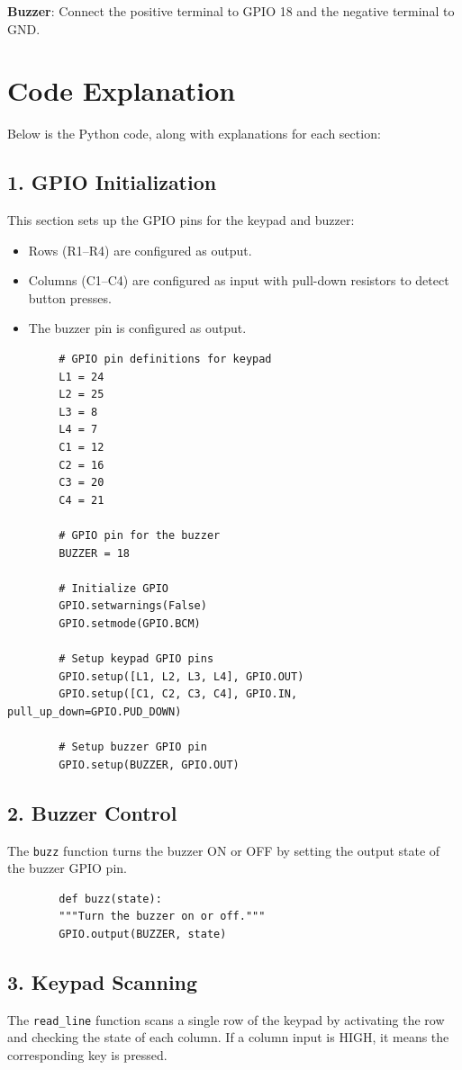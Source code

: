 \documentclass{article}
\begin{document}
	\textbf{Buzzer}: Connect the positive terminal to GPIO 18 and the negative terminal to GND.
	
	
	\section*{Code Explanation}
	Below is the Python code, along with explanations for each section:
	
	\subsection*{1. GPIO Initialization}
	This section sets up the GPIO pins for the keypad and buzzer:
	\begin{itemize}
		\item Rows (R1–R4) are configured as output.
		\item Columns (C1–C4) are configured as input with pull-down resistors to detect button presses.
		\item The buzzer pin is configured as output.
	\end{itemize}
	
	\begin{lstlisting}
		# GPIO pin definitions for keypad
		L1 = 24
		L2 = 25
		L3 = 8
		L4 = 7
		C1 = 12
		C2 = 16
		C3 = 20
		C4 = 21
		
		# GPIO pin for the buzzer
		BUZZER = 18
		
		# Initialize GPIO
		GPIO.setwarnings(False)
		GPIO.setmode(GPIO.BCM)
		
		# Setup keypad GPIO pins
		GPIO.setup([L1, L2, L3, L4], GPIO.OUT)
		GPIO.setup([C1, C2, C3, C4], GPIO.IN, pull_up_down=GPIO.PUD_DOWN)
		
		# Setup buzzer GPIO pin
		GPIO.setup(BUZZER, GPIO.OUT)
	\end{lstlisting}
	
	\subsection*{2. Buzzer Control}
	The \texttt{buzz} function turns the buzzer ON or OFF by setting the output state of the buzzer GPIO pin.
	
	\begin{lstlisting}
		def buzz(state):
		"""Turn the buzzer on or off."""
		GPIO.output(BUZZER, state)
	\end{lstlisting}
	
	\subsection*{3. Keypad Scanning}
	The \texttt{read\_line} function scans a single row of the keypad by activating the row and checking the state of each column. If a column input is HIGH, it means the corresponding key is pressed.
	
\end{document}
